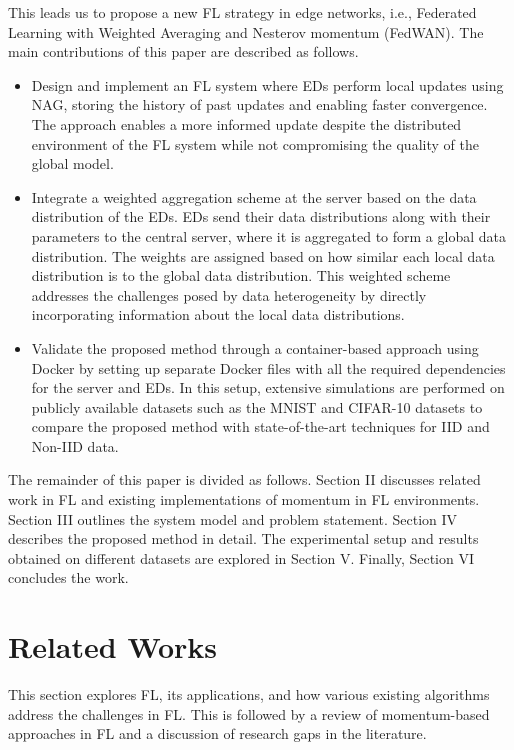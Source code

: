 \documentclass[journal]{IEEEtran}
\begin{document}
This leads us to propose a new FL strategy in edge networks, i.e., Federated Learning with Weighted Averaging and Nesterov momentum (FedWAN). The main contributions of this paper are described as follows.
\begin{itemize}
    \item Design and implement an FL system where EDs perform local updates using NAG, storing the history of past updates and enabling faster convergence. The approach enables a more informed update despite the distributed environment of the FL system while not compromising the quality of the global model.
    \item Integrate a weighted aggregation scheme at the server based on the data distribution of the EDs. EDs send their data distributions along with their parameters to the central server, where it is aggregated to form a global data distribution. The weights are assigned based on how similar each local data distribution is to the global data distribution. This weighted scheme addresses the challenges posed by data heterogeneity by directly incorporating information about the local data distributions. 
    \item Validate the proposed method through a container-based approach using Docker by setting up separate Docker files with all the required dependencies for the server and EDs. In this setup, extensive simulations are performed on publicly available datasets such as the MNIST and CIFAR-10 datasets to compare the proposed method with state-of-the-art techniques for IID and Non-IID data.
\end{itemize}

The remainder of this paper is divided as follows. Section II discusses related work in FL and existing implementations of momentum in FL environments. Section III outlines the system model and problem statement. Section IV describes the proposed method in detail. The experimental setup and results obtained on different datasets are explored in Section V. Finally, Section VI concludes the work.


\section{Related Works}
This section explores FL, its applications, and how various existing algorithms address the challenges in FL. This is followed by a review of momentum-based approaches in FL and a discussion of research gaps in the literature.
\end{document}
